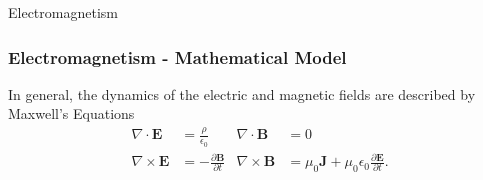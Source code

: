 \documentclass{beamer}
\begin{document}
\begin{frame}

    \begin{block}{}
        \centering \Large Electromagnetism
    \end{block}

\end{frame}

\begin{frame}
    \frametitle{Electromagnetism - Mathematical Model}
    In general, the dynamics of the electric and magnetic fields are described by Maxwell's Equations
    \begin{equation}
    \begin{aligned}
        \nabla \cdot \mathbf{E}  &= \frac{\rho}{\epsilon_0}                 & \nabla \cdot \mathbf{B}  &= 0 \\
        \nabla \times \mathbf{E} &= -\frac{\partial \mathbf{B}}{\partial t} & \nabla \times \mathbf{B} &= \mu_0 \mathbf{J} + \mu_0 \epsilon_0 \frac{\partial \mathbf{E}}{\partial t}.
    \end{aligned}
    \end{equation}
\end{frame}
\end{document}
